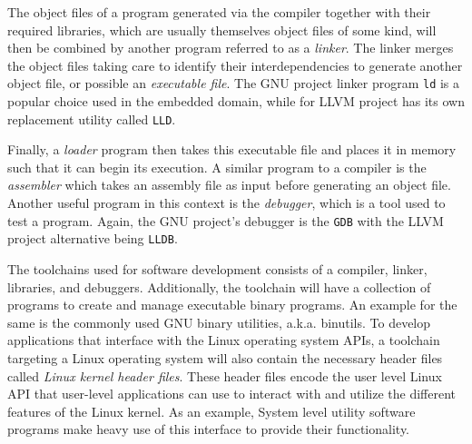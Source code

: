 The object files of a program generated via the compiler together with their required libraries, which are usually themselves object files of some kind, will then be combined by another program referred to as a \textit{linker}. The linker merges the object files taking care to identify their interdependencies to generate another object file, or possible an \textit{executable file}. The GNU project linker program \texttt{ld} is a popular choice used in the embedded domain, while for LLVM project has its own replacement utility called \texttt{LLD}.

\begin{figure}[H]
	\centering
\end{figure}

Finally, a \textit{loader} program then takes this executable file and places it in memory such that it can begin its execution. A similar program to a compiler is the \textit{assembler} which takes an assembly file as input before generating an object file. Another useful program in this context is the \textit{debugger}, which is a tool used to test a program. Again, the GNU project's debugger is the \texttt{GDB} with the LLVM project alternative being \texttt{LLDB}.

The toolchains used for software development consists of a compiler, linker, libraries, and debuggers. Additionally, the toolchain will have a collection of programs to create and manage executable binary programs. An example for the same is the commonly used GNU binary utilities, a.k.a. binutils. To develop applications that interface with the Linux operating system APIs, a toolchain targeting a Linux operating system will also contain the necessary header files called \textit{Linux kernel header files}. These header files encode the user level Linux API that user-level applications can use to interact with and utilize the different features of the Linux kernel. As an example, System level utility software programs make heavy use of this interface to provide their functionality.

